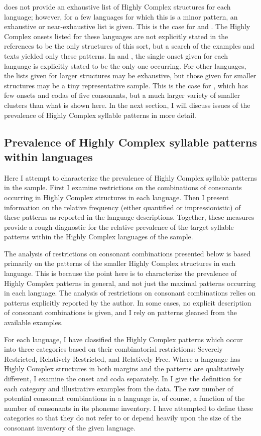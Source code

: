    does not provide an exhaustive list of Highly Complex structures for each language; however, for a few languages for which this is a minor pattern, an exhaustive or near-exhaustive list is given. This is the case for  and . The Highly Complex onsets listed for these languages are not explicitly stated in the references to be the only structures of this sort, but a search of the examples and texts yielded only these patterns. In  and , the single onset given for each language is explicitly stated to be the only one occurring. For other languages, the lists given for larger structures may be exhaustive, but those given for smaller structures may be a tiny representative sample. This is the case for , which has few onsets and codas of five consonants, but a much larger variety of smaller clusters than what is shown here. In the next section, I will discuss issues of the prevalence of Highly Complex syllable patterns in more detail.

\subsection{Prevalence of Highly Complex syllable patterns within languages}\label{sec:3.4.2}

  Here I attempt to characterize the prevalence of Highly Complex syllable patterns in the sample. First I examine restrictions on the combinations of consonants occurring in Highly Complex structures in each language. Then I present information on the relative frequency (either quantified or impressionistic) of these patterns as reported in the language descriptions. Together, these measures provide a rough diagnostic for the relative prevalence of the target syllable patterns within the Highly Complex languages of the sample.

  The analysis of restrictions on consonant combinations presented below is based primarily on the patterns of the smaller Highly Complex structures in each language. This is because the point here is to characterize the prevalence of Highly Complex patterns in general, and not just the maximal patterns occurring in each language. The analysis of restrictions on consonant combinations relies on patterns explicitly reported by the author. In some cases, no explicit description of consonant combinations is given, and I rely on patterns gleaned from the available examples. 

  For each language, I have classified the Highly Complex patterns which occur into three categories based on their combinatorial restrictions: Severely Restricted, Relatively Restricted, and Relatively Free. Where a language has Highly Complex structures in both margins and the patterns are qualitatively different, I examine the onset and coda separately. In  I give the definition for each category and illustrative examples from the data. The raw number of potential consonant combinations in a language is, of course, a function of the number of consonants in its phoneme inventory. I have attempted to define these categories so that they do not refer to or depend heavily upon the size of the consonant inventory of the given language.

